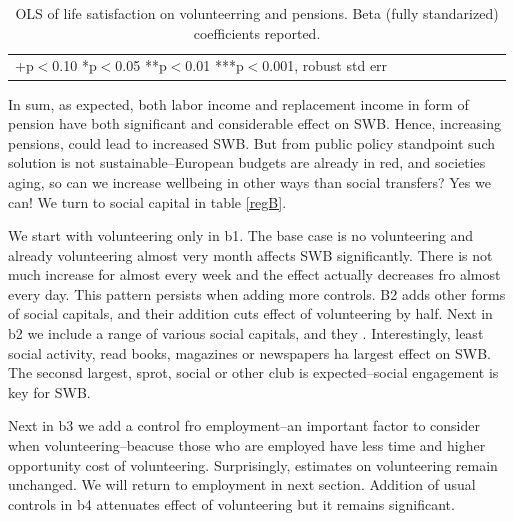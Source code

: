 \documentclass[10pt, letterpaper]{article}
\begin{document}
\begin{spacing}{1.4}
\begin{spacing}{.9}
\begin{table}[H]\centering \caption{OLS of life satisfaction on volunteerring
    and pensions. Beta (fully standarized) coefficients reported.}  \begin{scriptsize} \begin{tabular}{p{1.8in}p{.5in}p{.5in}p{.5in}p{.5in}p{.5in}p{.5in}p{.5in}p{.5in}p{.5in}p{.4in}p{.5in}p{.4in}}\hline 
      \hline\multicolumn{5}{l}{+p$<$0.10 *p$<$0.05 **p$<$0.01 ***p$<$0.001,
        robust std err} \end{tabular}\label{regA} \end{scriptsize}\end{table}
\end{spacing}


In sum, as expected, both labor income and replacement income in form of pension
have both significant and considerable effect on SWB. Hence, increasing
pensions, could lead to increased SWB. But from public policy standpoint such
solution is not sustainable--European budgets are already in red,  and societies
aging, so can we increase wellbeing in other ways than social transfers? Yes we
can! We turn to social capital in table \ref{regB}.

We start with  volunteering only in b1. The base case is no volunteering and
already volunteering almost very month affects SWB significantly. There is not
much increase for almost every week and the effect actually decreases fro almost
every day. This pattern persists when adding more controls. B2 adds other forms
of social capitals, and their addition cuts effect of volunteering by half.
%
Next in b2 we include a range of various social capitals, and they
. Interestingly, least social activity,  read books, magazines or newspapers ha
largest effect on SWB. The seconsd largest, sprot, social or other club is
expected--social engagement is key for SWB.

Next in b3 we add a control fro employment--an important factor to consider when
volunteering--beacuse those who are employed have less time and higher
opportunity cost of volunteering. Surprisingly, estimates on volunteering remain
unchanged. We will return to employment in next section.
Addition of usual controls in b4 attenuates effect of volunteering but it
remains significant.
 





\end{spacing}
\end{document}
